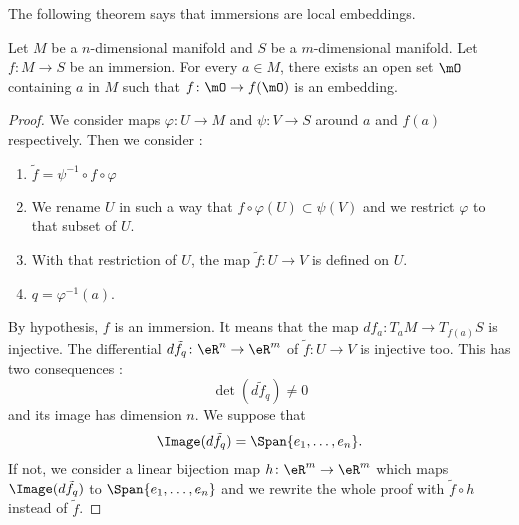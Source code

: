 The following theorem says that immersions are local embeddings.
\begin{theorem}       \label{THOooXAOUooRKHMBm}
    Let \( M\) be a \( n\)-dimensional manifold and \( S\) be a \( m\)-dimensional manifold. Let \( f\colon M\to S\) be an immersion. For every \( a\in M\), there exists an open set \( \mO\) containing \( a\) in \( M\) such that \( f\colon \mO\to f(\mO)\) is an embedding.
\end{theorem}

\begin{proof}
    We consider maps \( \varphi\colon U\to M\) and \( \psi\colon V\to S\) around \( a\) and \( f(a)\) respectively. Then we consider :
    \begin{enumerate}
        \item
            \( \tilde f=\psi^{-1}\circ f\circ\varphi\) 
        \item
            We rename \( U  \) in such a way that \( f\circ\varphi(U)\subset \psi(V)\) and we restrict \( \varphi\) to that subset of \( U\).
        \item
            With that restriction of \( U\), the map \( \tilde f\colon U\to V\) is defined on \( U\).
        \item
            \( q=\varphi^{-1}(a)\). 
    \end{enumerate}

    By hypothesis, \( f\) is an immersion. It means that the map \( df_a\colon T_aM\to T_{f(a)}S\) is injective. The differential \( d\tilde f_q\colon \eR^n\to \eR^m\) of \( \tilde f\colon U\to V\) is injective too. This has two consequences : 
    \begin{equation}
        \det(d\tilde f_q)\neq 0
    \end{equation}
    and its image has dimension \( n\). We suppose that
    \begin{equation}
        \Image(d\tilde f_q)=\Span\{ e_1,\ldots, e_n \}.
    \end{equation}
    If not, we consider a linear bijection map \( h\colon \eR^m\to \eR^m\) which maps \( \Image(d\tilde f_q)\) to \( \Span\{ e_1,\ldots, e_n \}\) and we rewrite the whole proof with \( \tilde f\circ h\) instead of \( \tilde f\).


\end{proof}

